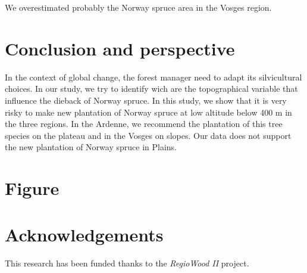 \documentclass[3p,procedia]{elsarticle}
\begin{document}
We overestimated probably the Norway spruce area in the Vosges region.
\section{Conclusion and perspective}

In the context of global change, the forest manager need to adapt its silvicultural choices.
In our study, we try to identify wich are the topographical variable that influence the dieback of Norway spruce.
In this study, we show that it is very risky to make new plantation of Norway spruce at low altitude below 400 m in the three regions.
In the Ardenne, we recommend the plantation of this tree species on the plateau and in the Vosges on slopes. 
Our data does not support the new plantation of Norway spruce in Plains. 
\section{Figure}


	


\section{Acknowledgements}

This research has been funded thanks to the \textit{RegioWood II} project.

%

\end{document}
